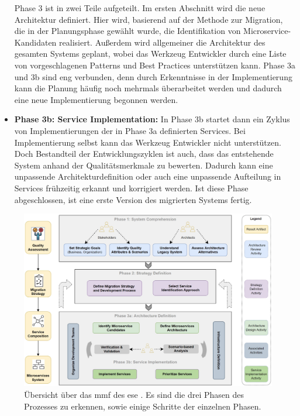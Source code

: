 \begin{itemize}
	Phase 3 ist in zwei Teile aufgeteilt.
	Im ersten Abschnitt wird die neue Architektur definiert.
	Hier wird, basierend auf der Methode zur Migration, die in der Planungsphase gewählt wurde, die Identifikation von Microservice-Kandidaten realisiert.
	Außerdem wird allgemeiner die Architektur des gesamten Systems geplant, wobei das Werkzeug Entwickler durch eine Liste von vorgeschlagenen Patterns und Best Practices unterstützen kann.
	 Phase 3a und 3b sind eng verbunden, denn durch Erkenntnisse in der Implementierung kann die Planung häufig noch mehrmals überarbeitet werden und dadurch eine neue Implementierung begonnen werden.
	\item \textbf{Phase 3b: Service Implementation:} In Phase 3b startet dann ein Zyklus von Implementierungen der in Phase 3a definierten Services.
	Bei Implementierung selbst kann das Werkzeug Entwickler nicht unterstützen.
	Doch Bestandteil der Entwicklungszyklen ist auch, dass das entstehende System anhand der Qualitätsmerkmale zu bewerten.
	Dadurch kann eine unpassende Architekturdefinition oder auch eine unpassende Aufteilung in Services frühzeitig erkannt und korrigiert werden.
	Ist diese Phase abgeschlossen, ist eine erste Version des migrierten Systems fertig.
\end{itemize}

\begin{figure}
	\centering
	\includegraphics[width=\textwidth]{figures/mmf-overview}
	\caption[\acrfull{mmf} Übersicht]{
		Übersicht über das \gls{mmf} des \gls{ese} \cite{fritzsch2022architecturecentric}. Es sind die drei Phasen des Prozesses zu erkennen, sowie einige Schritte der einzelnen Phasen.
	}
	\label{fig:mmf-overview}
\end{figure}

